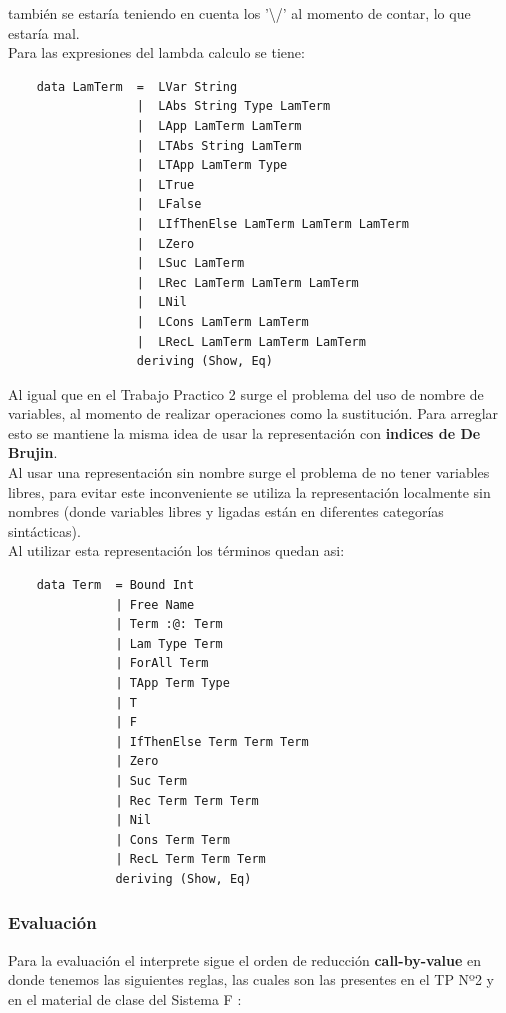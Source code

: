 \documentclass[12pt, titlepage, a4paper]{article}
\begin{document}
  también se estaría teniendo en cuenta los '\textbackslash/' al momento de contar, lo que estaría mal.\\

\noindent Para las expresiones del lambda calculo se tiene:
\begin{verbatim}
    data LamTerm  =  LVar String
                  |  LAbs String Type LamTerm
                  |  LApp LamTerm LamTerm
                  |  LTAbs String LamTerm
                  |  LTApp LamTerm Type
                  |  LTrue 
                  |  LFalse
                  |  LIfThenElse LamTerm LamTerm LamTerm
                  |  LZero
                  |  LSuc LamTerm
                  |  LRec LamTerm LamTerm LamTerm
                  |  LNil
                  |  LCons LamTerm LamTerm
                  |  LRecL LamTerm LamTerm LamTerm
                  deriving (Show, Eq)
\end{verbatim}

Al igual que en el Trabajo Practico 2 \cite{tp2:lambdaCalculoSimpleTipado} surge el problema del uso de nombre de variables, al 
momento de realizar operaciones como la sustitución. Para arreglar esto se mantiene la misma idea de 
usar la representación con \textbf{indices de De Brujin}. \\

Al usar una representación sin nombre surge el problema de no tener variables libres,  
para evitar este inconveniente se utiliza la representación localmente sin nombres (donde variables libres y ligadas están 
en diferentes categorías sintácticas). \\

\noindent Al utilizar esta representación los términos quedan asi:
\begin{verbatim}
    data Term  = Bound Int
               | Free Name 
               | Term :@: Term
               | Lam Type Term
               | ForAll Term
               | TApp Term Type
               | T
               | F
               | IfThenElse Term Term Term
               | Zero
               | Suc Term
               | Rec Term Term Term
               | Nil
               | Cons Term Term
               | RecL Term Term Term
               deriving (Show, Eq)
\end{verbatim}


\subsubsection{Evaluación}
Para la evaluación el interprete sigue el orden de reducción \textbf{call-by-value} en donde tenemos las siguientes reglas, las cuales 
son las presentes en el TP Nº2 \cite{tp2:lambdaCalculoSimpleTipado} y en el material de clase del Sistema F \cite{ALP:Polimorfismo}:
\end{document}
